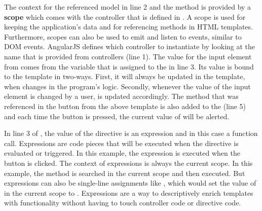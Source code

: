 The context for the referenced model  in line 2 and the method  is provided by a \textbf{scope} which comes with the controller that is defined in . A scope is used for keeping the application's data and for referencing methods in HTML templates. Furthermore, scopes can also be used to emit and listen to events, similar to DOM events. AngularJS defines which controller to instantiate by looking at the name that is provided from controllers (line 1). The value for the input element from  comes from the variable that is assigned to the  in line 3. Its value is bound to the template in two-ways. First, it will always be updated in the template, when  changes in the program's logic. Secondly, whenever the value of the input element is changed by a user,  is updated accordingly. The method that was referenced in the button from the above template is also added to the  (line 5) and each time the button is pressed, the current value of  will be alerted.

In line 3 of , the value of the  directive is an expression and in this case a function call. Expressions are code pieces that will be executed when the directive is evaluated or triggered. In this example, the expression  is executed when the button is clicked. The context of expressions is always the current scope. In this example, the method  is searched in the current scope and then executed. But expressions can also be single-line assignments like , which would set the value of  in the current scope to . Expressions are a way to descriptively enrich templates with functionality without having to touch controller code or directive code. 